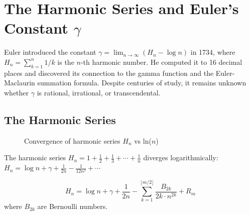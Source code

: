 
\chapter{The Harmonic Series and Euler's Constant $\gamma$}

\begin{historical}
Euler introduced the constant $\gamma = \lim_{n \to \infty} (H_n - \log n)$ in 1734,
where $H_n = \sum_{k=1}^n 1/k$ is the $n$-th harmonic number. He computed it to 16
decimal places and discovered its connection to the gamma function and the
Euler-Maclaurin summation formula. Despite centuries of study, it remains unknown
whether $\gamma$ is rational, irrational, or transcendental.
\end{historical}

\section{The Harmonic Series}

\begin{figure}[H]
\centering
{}
\caption{Convergence of harmonic series $H_n$ vs ln($n$)}
\label{fig:harmonic}
\end{figure}

The harmonic series $H_n = 1 + \frac{1}{2} + \frac{1}{3} + \cdots + \frac{1}{n}$
diverges logarithmically: $H_n = \log n + \gamma + \frac{1}{2n} - \frac{1}{12n^2} + \cdots$

\begin{theorem}
\[
H_n = \log n + \gamma + \frac{1}{2n} - \sum_{k=1}^{\lfloor m/2 \rfloor} \frac{B_{2k}}{2k \cdot n^{2k}} + R_m
\]
where $B_{2k}$ are Bernoulli numbers.
\end{theorem}

